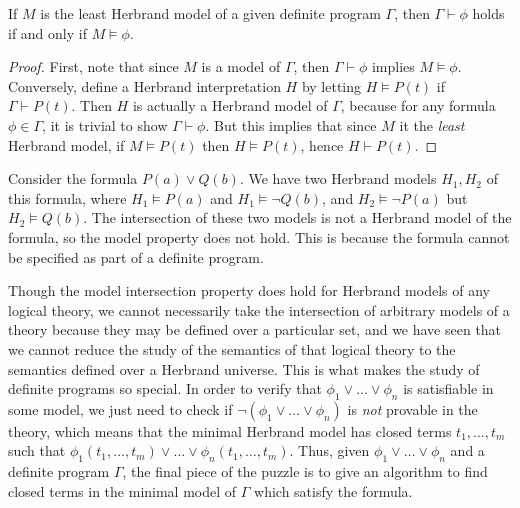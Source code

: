 \begin{theorem}
    If $M$ is the least Herbrand model of a given definite program $\Gamma$, then $\Gamma \vdash \phi$ holds if and only if $M \vDash \phi$.
\end{theorem}
\begin{proof}
    First, note that since $M$ is a model of $\Gamma$, then $\Gamma \vdash \phi$ implies $M \vDash \phi$. Conversely, define a Herbrand interpretation $H$ by letting $H \vDash P(t)$ if $\Gamma \vdash P(t)$. Then $H$ is actually a Herbrand model of $\Gamma$, because for any formula $\phi \in \Gamma$, it is trivial to show $\Gamma \vdash \phi$. But this implies that since $M$ it the {\it least} Herbrand model, if $M \vDash P(t)$ then $H \vDash P(t)$, hence $H \vdash P(t)$.
\end{proof}

\begin{example}
    Consider the formula $P(a) \vee Q(b)$. We have two Herbrand models $H_1, H_2$ of this formula, where $H_1 \vDash P(a)$ and $H_1 \vDash \neg Q(b)$, and $H_2 \vDash \neg P(a)$ but $H_2 \vDash Q(b)$. The intersection of these two models is not a Herbrand model of the formula, so the model property does not hold. This is because the formula cannot be specified as part of a definite program.
\end{example}

Though the model intersection property does hold for Herbrand models of any logical theory, we cannot necessarily take the intersection of arbitrary models of a theory because they may be defined over a particular set, and we have seen that we cannot reduce the study of the semantics of that logical theory to the semantics defined over a Herbrand universe. This is what makes the study of definite programs so special. In order to verify that $\phi_1 \vee \dots \vee \phi_n$ is satisfiable in some model, we just need to check if $\neg (\phi_1 \vee \dots \vee \phi_n)$ is {\it not} provable in the theory, which means that the minimal Herbrand model has closed terms $t_1, \dots, t_m$ such that $\phi_1(t_1, \dots, t_m) \vee \dots \vee \phi_n(t_1, \dots, t_m)$. Thus, given $\phi_1 \vee \dots \vee \phi_n$ and a definite program $\Gamma$, the final piece of the puzzle is to give an algorithm to find closed terms in the minimal model of $\Gamma$ which satisfy the formula.

